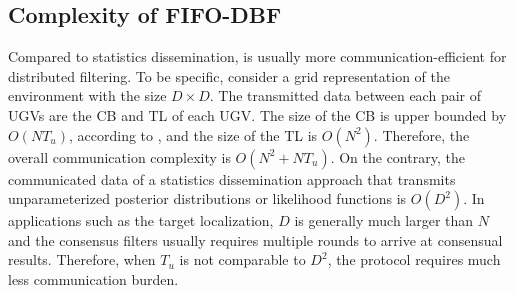 	

	
	\subsection{Complexity of FIFO-DBF}
	Compared to statistics dissemination, {\proto} is usually more communication-efficient for distributed filtering. 
	To be specific, consider a grid representation of the environment with the size $D\times D$. %
	The transmitted data between each pair of UGVs are the CB and TL of each UGV.
	The size of the CB is upper bounded by $O(NT_u)$, according to , and the size of the TL is $O(N^2)$.
	Therefore, the overall communication complexity is $O(N^2+NT_u)$.	
	On the contrary, the communicated data of a statistics dissemination approach that transmits unparameterized posterior distributions or likelihood functions is $O(D^2)$.
	In applications such as the target localization, $D$ is generally much larger than $N$ and the consensus filters usually requires multiple rounds to arrive at consensual results.
	Therefore, when $T_u$ is not comparable to $D^2$, the {\proto} protocol requires much less communication burden.
	
